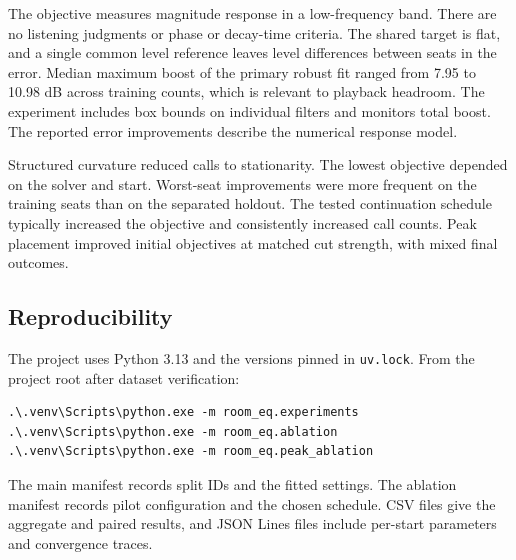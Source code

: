 \documentclass[11pt,letterpaper]{article}
\begin{document}
The objective measures magnitude response in a low-frequency band. There
are no listening judgments or phase or decay-time criteria. The shared
target is flat, and a single common level reference leaves level differences
between seats in the error. Median maximum boost of the primary robust
fit ranged from 7.95 to 10.98 dB across training counts, which is relevant
to playback headroom. The experiment includes box bounds on individual
filters and monitors total boost. The reported error improvements describe
the numerical response model.

Structured curvature reduced calls to stationarity. The lowest objective
depended on the solver and start. Worst-seat improvements were more frequent
on the training seats than on the separated holdout. The tested continuation
schedule typically increased the objective and consistently increased call
counts. Peak placement improved initial objectives at matched cut strength,
with mixed final outcomes.

\subsection*{Reproducibility}
The project uses Python 3.13 and the versions pinned in
\texttt{uv.lock}. From the project root after dataset verification:
\begin{verbatim}
.\.venv\Scripts\python.exe -m room_eq.experiments
.\.venv\Scripts\python.exe -m room_eq.ablation
.\.venv\Scripts\python.exe -m room_eq.peak_ablation
\end{verbatim}
The main manifest records split IDs and the fitted settings.
The ablation manifest records pilot configuration and the chosen schedule.
CSV files give the aggregate and paired results, and JSON Lines files
include per-start parameters and convergence traces.
\end{document}
